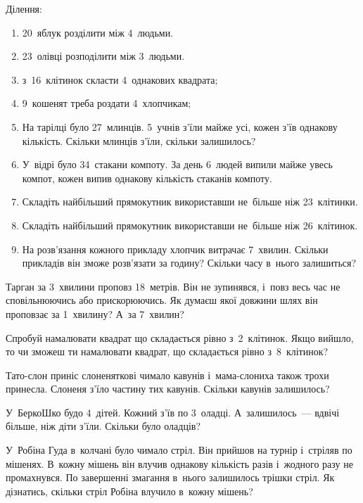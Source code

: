 \problem
Ділення:
\begin{enumerate}
    \item 20~яблук розділити між 4~людьми.
    \item 23~олівці розподілити між 3~людьми.
    \item з~16~клітинок скласти 4~однакових квадрата;
    \item 9~кошенят треба роздати 4~хлопчикам;
    \item На тарілці було 27~млинців. 5~учнів з'їли майже усі,
    кожен з'їв однакову кількість.
    Скільки млинців з'їли, скільки залишилось?
    \item У~відрі було 34~стакани компоту.
    За день 6~людей випили майже увесь компот,
    кожен випив однакову кількість стаканів компоту.
    \item Складіть найбільший прямокутник використавши
    не~більше ніж 23~клітинки.
    \item Складіть найбільший прямокутник використавши
    не~більше ніж 26~клітинок.
    \item На розв'язання кожного прикладу хлопчик витрачає 7~хвилин.
    Скільки прикладів він зможе розв'язати за годину?
    Скільки часу в~нього залишиться?
\end{enumerate}


\problem
Тарган за 3~хвилини проповз 18~метрів.
Він не зупинявся, і~повз весь час не сповільнюючись або прискорюючись.
Як думаєш якої довжини шлях він проповзає за 1~хвилину?
А~за 7~хвилин?


\problem
Спробуй намалювати квадрат що складається рівно з~2~клітинок.
Якщо вийшло, то чи зможеш ти намалювати квадрат,
що складається рівно з~8~клітинок?


\problem
Тато-слон приніс слоненяткові чимало кавунів
і~мама-слониха також трохи принесла.
Слоненя з’їло частину тих кавунів.
Скільки кавунів залишилось?


\problem
У~БеркоШко будо 4~дітей. Кожний з’їв по 3~оладці.
А~залишилось~--- вдвічі більше, ніж діти з’їли.
Скільки було оладців?


\problem
У~Робіна Гуда в~колчані було чимало стріл.
Він прийшов на турнір і~стріляв по мішенях.
В~кожну мішень він влучив однакову кількість разів
і~жодного разу не промахнувся.
По завершенні змагання в~нього залишилось трішки стріл.
Як дізнатись, скільки стріл Робіна влучило в~кожну мішень?


